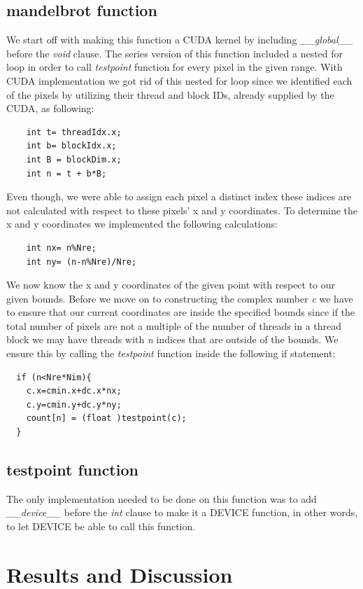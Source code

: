 \documentclass{report}
\begin{document}
\section{mandelbrot function}
We start off with making this function a CUDA kernel by including \emph{\_\_global\_\_} before the \emph{void} clause. The series version of this function included a nested for loop in order to call \emph{testpoint} function for every pixel in the given range. With CUDA implementation we got rid of this nested for loop since we identified each of the pixels by utilizing their thread and block IDs, already supplied by the CUDA, as following:
\begin{verbatim}
    int t= threadIdx.x;
    int b= blockIdx.x;
    int B = blockDim.x;
    int n = t + b*B;
\end{verbatim}
\pagebreak
Even though, we were able to assign each pixel a distinct index these indices are not calculated with respect to these pixels' x and y coordinates. To determine the x and y coordinates we implemented the following calculations:
\begin{verbatim}
    int nx= n%Nre;
    int ny= (n-n%Nre)/Nre;
\end{verbatim}
We now know the x and y coordinates of the given point with respect to our given bounds. Before we move on to constructing the complex number \emph{c} we have to ensure that our current coordinates are inside the specified bounds since if the total number of pixels are not a multiple of the number of threads in a thread block we may have threads with \emph{n} indices that are outside of the bounds. We ensure this by calling the \emph{testpoint} function inside the following if statement:
\begin{verbatim}
  if (n<Nre*Nim){
    c.x=cmin.x+dc.x*nx;
    c.y=cmin.y+dc.y*ny;
    count[n] = (float )testpoint(c);   
  }
\end{verbatim}

\section{testpoint function}
The only implementation needed to be done on this function was to add \emph{\_\_device\_\_} before the \emph{int} clause to make it a DEVICE function, in other words, to let DEVICE be able to call this function.

\chapter{Results and Discussion}
\end{document}
